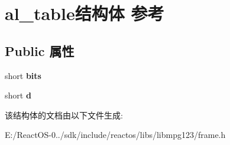 \hypertarget{structal__table}{}\section{al\+\_\+table结构体 参考}
\label{structal__table}
\subsection*{Public 属性}
\begin{DoxyCompactItemize}
\item 
\mbox{\label{structal__table_a2013e092f08c78936ff6c851c2cb3ee4}} 
short {\bfseries bits}
\item 
\mbox{\label{structal__table_a25b21e8ab9b5323e617802ccb8f94e44}} 
short {\bfseries d}
\end{DoxyCompactItemize}


该结构体的文档由以下文件生成\+:\begin{DoxyCompactItemize}
\item 
E\+:/\+React\+O\+S-\/0../sdk/include/reactos/libs/libmpg123/frame.\+h\end{DoxyCompactItemize}
